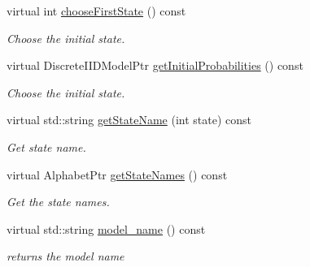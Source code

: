 \begin{DoxyCompactItemize}
virtual int \hyperlink{classtops_1_1GeneralizedHiddenMarkovModel_ae42041710ca7d90aeddfa139225a61fa}{choose\+First\+State} () const
\begin{DoxyCompactList}\small\item\em Choose the initial state. \end{DoxyCompactList}\item 
\mbox{\label{classtops_1_1GeneralizedHiddenMarkovModel_a7e3a1ae6f422ed74abb52c5f1ec4f5b6}} 
virtual Discrete\+I\+I\+D\+Model\+Ptr \hyperlink{classtops_1_1GeneralizedHiddenMarkovModel_a7e3a1ae6f422ed74abb52c5f1ec4f5b6}{get\+Initial\+Probabilities} () const
\begin{DoxyCompactList}\small\item\em Choose the initial state. \end{DoxyCompactList}\item 
\mbox{\label{classtops_1_1GeneralizedHiddenMarkovModel_aaa5ecf2361626214250973423601232c}} 
virtual std\+::string \hyperlink{classtops_1_1GeneralizedHiddenMarkovModel_aaa5ecf2361626214250973423601232c}{get\+State\+Name} (int state) const
\begin{DoxyCompactList}\small\item\em Get state name. \end{DoxyCompactList}\item 
\mbox{\label{classtops_1_1GeneralizedHiddenMarkovModel_a000cb9fd5f3bd1bf4fae9397d865001d}} 
virtual Alphabet\+Ptr \hyperlink{classtops_1_1GeneralizedHiddenMarkovModel_a000cb9fd5f3bd1bf4fae9397d865001d}{get\+State\+Names} () const
\begin{DoxyCompactList}\small\item\em Get the state names. \end{DoxyCompactList}\item 
\mbox{\label{classtops_1_1GeneralizedHiddenMarkovModel_a442965497ea65261192915f5ee174165}} 
virtual std\+::string \hyperlink{classtops_1_1GeneralizedHiddenMarkovModel_a442965497ea65261192915f5ee174165}{model\+\_\+name} () const
\begin{DoxyCompactList}\small\item\em returns the model name \end{DoxyCompactList}\item 

\end{DoxyCompactItemize}
